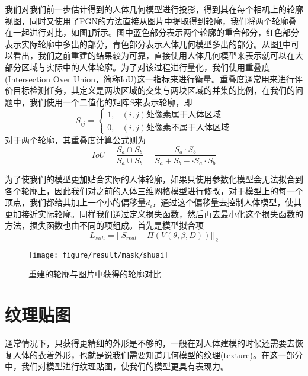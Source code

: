 我们对我们前一步估计得到的人体几何模型进行投影，得到其在每个相机上的轮廓视图，同时又使用了PGN的方法直接从图片中提取得到轮廓，我们将两个轮廓叠在一起进行对比，如图\ref{fig:maskcom}所示。图中蓝色部分表示两个轮廓的重合部分，红色部分表示实际轮廓中多出的部分，青色部分表示人体几何模型多出的部分。从图\ref{fig:maskcom}中可以看出，我们之前重建的结果较为可靠，直接使用人体几何模型来表示就可以在大部分区域与实际中的人体轮廓。为了对该过程进行量化，我们使用重叠度(Intersection Over Union，简称IoU)这一指标来进行衡量。重叠度通常用来进行评价目标检测任务，其定义是两块区域的交集与两块区域的并集的比例，在我们的问题中，我们使用一个二值化的矩阵\(S\)来表示轮廓，即
\begin{equation}
    S_{ij} = \begin{cases}
        1, & \text{\((i,j)\)处像素属于人体区域} \\
        0, & \text{\((i,j)\)处像素不属于人体区域}
    \end{cases}
\end{equation}
对于两个轮廓，其重叠度计算公式则为
\begin{equation}
    IoU = \frac{S_a \cap S_b}{S_a \cup S_b} = \frac{S_a \cdot S_b}{S_a + S_b - \cdot S_a\cdot S_b}
\end{equation}

为了使我们的模型更加贴合实际的人体轮廓，如果只使用参数化模型会无法拟合到各个轮廓上，因此我们对之前的人体三维网格模型进行修改，对于模型上的每一个顶点，我们都给其加上一个小的偏移量\(d_i\)，通过这个偏移量去控制人体模型，使其更加接近实际轮廓。同样我们通过定义损失函数，然后再去最小化这个损失函数的方法，损失函数也由不同的项组成。首先是模型拟合项
\begin{equation}
    L_{silh} = || S_{real} - \Pi(V(\theta, \beta, D)) ||_2
\end{equation}


\begin{figure}[htbp]
    \centering
    \texttt{[image: figure/result/mask/shuai]}
    \caption{\label{fig:maskcom} 重建的轮廓与图片中获得的轮廓对比}
\end{figure}

\section{纹理贴图}
通常情况下，只获得更精细的外形是不够的，一般在对人体建模的时候还需要去恢复人体的衣着外形，也就是说我们需要知道几何模型的纹理(texture)。在这一部分中，我们对模型进行纹理贴图，使我们的模型更具有表现力。

